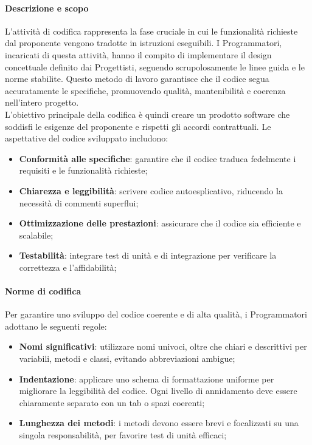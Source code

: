     \paragraph{Descrizione e scopo} 
    L’attività di codifica rappresenta la fase cruciale in cui le funzionalità richieste dal proponente vengono tradotte in istruzioni eseguibili. I Programmatori, incaricati di questa attività, hanno il compito di implementare il design concettuale definito dai Progettisti, seguendo scrupolosamente le linee guida e le norme stabilite. Questo metodo di lavoro garantisce che il codice segua accuratamente le specifiche, promuovendo qualità, mantenibilità e coerenza nell’intero progetto.\\
    L’obiettivo principale della codifica è quindi creare un prodotto software che soddisfi le esigenze del proponente e rispetti gli accordi contrattuali. Le aspettative del codice sviluppato includono:
    \begin{itemize}
        \item \textbf{Conformità alle specifiche}: garantire che il codice traduca fedelmente i requisiti e le funzionalità richieste;
        \item \textbf{Chiarezza e leggibilità}: scrivere codice autoesplicativo, riducendo la necessità di commenti superflui;
        \item \textbf{Ottimizzazione delle prestazioni}: assicurare che il codice sia efficiente e scalabile;
        \item \textbf{Testabilità}: integrare test di unità e di integrazione per verificare la correttezza e l’affidabilità;
    \end{itemize}
    
    \paragraph{Norme di codifica}
    Per garantire uno sviluppo del codice coerente e di alta qualità, i Programmatori adottano le seguenti regole:
    \begin{itemize}
        \item \textbf{Nomi significativi}: utilizzare nomi univoci, oltre che chiari e descrittivi per variabili, metodi e classi, evitando abbreviazioni ambigue;
        \item \textbf{Indentazione}: applicare uno schema di formattazione uniforme per migliorare la leggibilità del codice. Ogni livello di annidamento deve essere chiaramente separato con un tab o spazi coerenti;
        \item \textbf{Lunghezza dei metodi}: i metodi devono essere brevi e focalizzati su una singola responsabilità, per favorire test di unità efficaci;
    \end{itemize}
    
